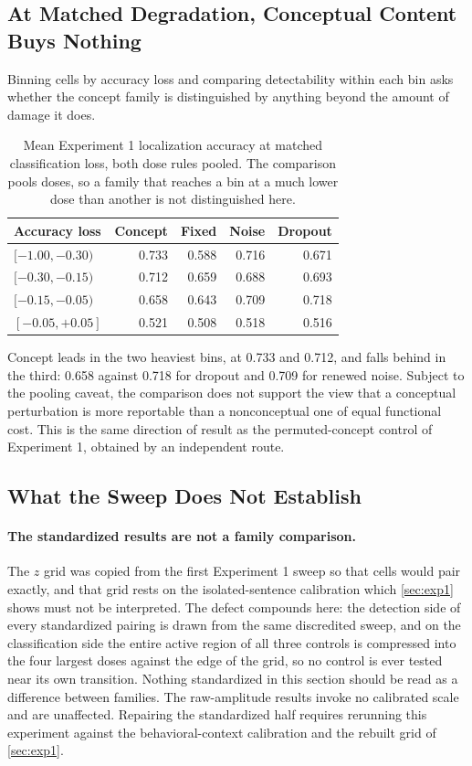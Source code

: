 \subsection{At Matched Degradation, Conceptual Content Buys Nothing}

Binning cells by accuracy loss and comparing detectability within each bin asks whether the concept family is distinguished by anything beyond the amount of damage it does.

\begin{table}[H]
\centering
\small
\begin{tabular}{lrrrr}
\toprule
Accuracy loss & Concept & Fixed & Noise & Dropout \\
\midrule
$[-1.00,-0.30)$ & 0.733 & 0.588 & 0.716 & 0.671 \\
$[-0.30,-0.15)$ & 0.712 & 0.659 & 0.688 & 0.693 \\
$[-0.15,-0.05)$ & 0.658 & 0.643 & 0.709 & 0.718 \\
$[-0.05,+0.05]$ & 0.521 & 0.508 & 0.518 & 0.516 \\
\bottomrule
\end{tabular}
\caption{Mean Experiment 1 localization accuracy at matched classification loss, both dose rules pooled. The comparison pools doses, so a family that reaches a bin at a much lower dose than another is not distinguished here.}
\label{tab:exp4matched}
\end{table}

Concept leads in the two heaviest bins, at 0.733 and 0.712, and falls behind in the third: 0.658 against 0.718 for dropout and 0.709 for renewed noise.
Subject to the pooling caveat, the comparison does not support the view that a conceptual perturbation is more reportable than a nonconceptual one of equal functional cost.
This is the same direction of result as the permuted-concept control of Experiment 1, obtained by an independent route.

\subsection{What the Sweep Does Not Establish}

\paragraph{The standardized results are not a family comparison.}
The $z$ grid was copied from the first Experiment 1 sweep so that cells would pair exactly, and that grid rests on the isolated-sentence calibration which \cref{sec:exp1} shows must not be interpreted.
The defect compounds here: the detection side of every standardized pairing is drawn from the same discredited sweep, and on the classification side the entire active region of all three controls is compressed into the four largest doses against the edge of the grid, so no control is ever tested near its own transition.
Nothing standardized in this section should be read as a difference between families.
The raw-amplitude results invoke no calibrated scale and are unaffected.
Repairing the standardized half requires rerunning this experiment against the behavioral-context calibration and the rebuilt grid of \cref{sec:exp1}.

